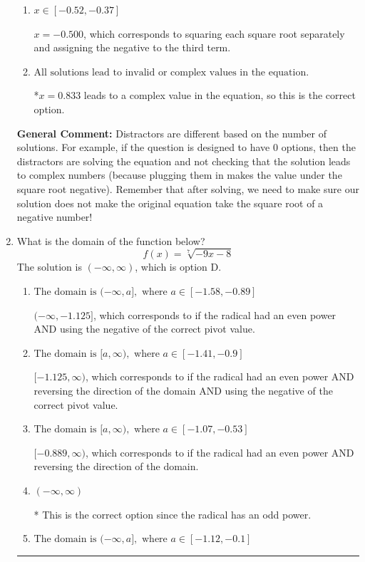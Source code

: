 \documentclass{extbook}[14pt]
\newcommand{\litem}[1]{\item #1

\rule{\textwidth}{0.4pt}}
\begin{document}
\begin{enumerate}
{\begin{enumerate}[label=\Alph*.]
This corresponds to not checking that the potential solution $x = 0.833$ leads to a complex value in the original equation.
\item \( x \in [-0.52,-0.37] \)

$x = -0.500$, which corresponds to squaring each square root separately and assigning the negative to the third term.
\item \( \text{All solutions lead to invalid or complex values in the equation.} \)

*$x = 0.833$ leads to a complex value in the equation, so this is the correct option.
\end{enumerate}

\textbf{General Comment:} Distractors are different based on the number of solutions. For example, if the question is designed to have 0 options, then the distractors are solving the equation and not checking that the solution leads to complex numbers (because plugging them in makes the value under the square root negative). Remember that after solving, we need to make sure our solution does not make the original equation take the square root of a negative number!
}
\litem{
What is the domain of the function below?
\[ f(x) = \sqrt[7]{-9 x - 8} \]The solution is \( (-\infty, \infty) \), which is option D.\begin{enumerate}[label=\Alph*.]
\item \( \text{The domain is } (-\infty, a], \text{   where } a \in [-1.58, -0.89] \)

$(-\infty, -1.125]$, which corresponds to if the radical had an even power AND using the negative of the correct pivot value.
\item \( \text{The domain is } [a, \infty), \text{   where } a \in [-1.41, -0.9] \)

$[-1.125, \infty)$, which corresponds to if the radical had an even power AND reversing the direction of the domain AND using the negative of the correct pivot value.
\item \( \text{The domain is } [a, \infty), \text{   where } a \in [-1.07, -0.53] \)

$[-0.889, \infty)$, which corresponds to if the radical had an even power AND reversing the direction of the domain.
\item \( (-\infty, \infty) \)

* This is the correct option since the radical has an odd power.
\item \( \text{The domain is } (-\infty, a], \text{   where } a \in [-1.12, -0.1] \)


\end{enumerate}}
\end{enumerate}
\end{document}
